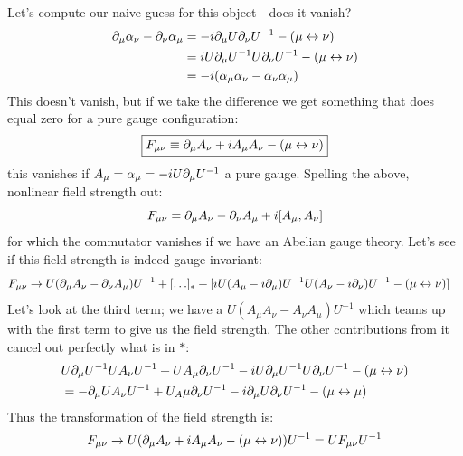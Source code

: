 Let's compute our naive guess for this object - does it vanish?
\begin{equation}
    \begin{split}
        \partial_\mu \alpha_\nu - \partial_\nu \alpha_\mu &= -i\partial_\mu U \partial_\nu U^{-1} - (\mu \leftrightarrow \nu)
        \\ &= iU\partial_\mu U^{-1} U \partial_\nu U^{-1} - (\mu \leftrightarrow \nu)
        \\ &= -i(\alpha_\mu \alpha_\nu - \alpha_\nu \alpha_\mu)
    \end{split}
\end{equation}
This doesn't vanish, but if we take the difference we get something that does equal zero for a pure gauge configuration:
\begin{equation}
    \boxed{F_{\mu\nu} \equiv \partial_\mu A_\nu + iA_\mu A_\nu - (\mu \leftrightarrow \nu)}
\end{equation}
this vanishes if $A_\mu = \alpha_\mu = -i U\partial_\mu U^{-1}$ a pure gauge. Spelling the above, nonlinear field strength out:
\begin{equation}
    F_{\mu\nu} = \partial_\mu A_\nu - \partial_\nu A_\mu + i[A_\mu, A_\nu]
\end{equation}
for which the commutator vanishes if we have an Abelian gauge theory. Let's see if this field strength is indeed gauge invariant:
\begin{equation}
    \begin{split}
        F_{\mu\nu} &\to U(\partial_\mu A_\nu - \partial_\nu A_\mu)U^{-1} + [\ldots]_* + [iU(A_\mu - i\partial_\mu)U^{-1}U(A_\nu - i\partial_\nu)U^{-1} - (\mu \leftrightarrow \nu)]
    \end{split}
\end{equation}
Let's look at the third term; we have a $U(A_\mu A_\nu - A_\nu A_\mu)U^{-1}$ which teams up with the first term to give us the field strength. The other contributions from it cancel out perfectly what is in $*$:
\begin{equation}
    \begin{split}
        &U\partial_\mu U^{-1}UA_\nu U^{-1} + UA_\mu \partial_\nu U^{-1} - iU\partial_\mu U^{-1} U \partial_\nu U^{-1} - (\mu \leftrightarrow \nu)
        \\ &= -\partial_\mu U A_\nu U^{-1} + U_A\mu \partial_\nu U^{-1} - i\partial_\mu U \partial_\nu U^{-1} - (\mu \leftrightarrow \mu)
    \end{split}
\end{equation}
Thus the transformation of the field strength is:
\begin{equation}
    F_{\mu\nu} \to U(\partial_\mu A_\nu + iA_\mu A_\nu - (\mu \leftrightarrow \nu))U^{-1} = UF_{\mu\nu}U^{-1}
\end{equation} 
